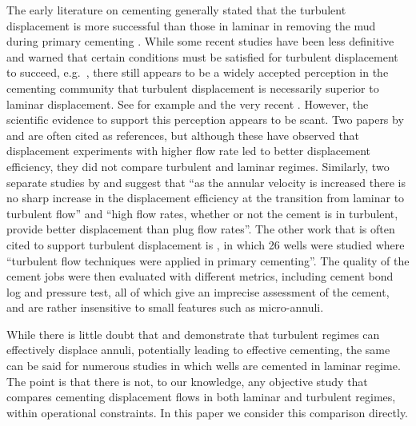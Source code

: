 \documentclass[review]{elsarticle}
\begin{document}
The early literature on cementing generally stated that the turbulent displacement is more successful than those in laminar in removing the mud during primary cementing \citep{Sauer1987,nelson1990,kettl1993}. While some recent studies have been less definitive and warned that certain conditions must be satisfied for turbulent displacement to succeed, e.g.~\cite{nelson06,khalilova2013}, there still appears to be a widely accepted perception in the cementing community that turbulent displacement is necessarily superior to laminar displacement. See for example \citet{kelessidis1996} and the very recent \citet{Lavrov2016,enayatpour2017}. However, the scientific evidence to support this perception appears to be scant. Two papers by \citet{howard1948} and \citet{smith1991} are often cited as references, but although these have observed that displacement experiments with higher flow rate led to better displacement efficiency, they did not compare turbulent and laminar regimes. Similarly, two separate studies by \citet{smith1989} and \citet{haut1979} suggest that ``as the annular velocity is increased there is no sharp increase in the displacement efficiency at the transition from laminar to turbulent flow'' and ``high flow rates, whether or not the cement is in turbulent, provide better displacement than plug flow rates''. The other work that is often cited to support turbulent displacement is \citet{Brice1964}, in which 26 wells were studied where ``turbulent flow techniques were applied in primary cementing''. The quality of the cement jobs were then evaluated with different metrics, including cement bond log and pressure test, all of which give an imprecise assessment of the cement, and are rather insensitive to small features such as micro-annuli.

While there is little doubt that \cite{howard1948,Brice1964} and \cite{smith1991} demonstrate that turbulent regimes can effectively displace annuli, potentially leading to effective cementing, the same can be said for numerous studies in which wells are cemented in laminar regime. The point is that there is not, to our knowledge, any objective study that compares cementing displacement flows in both laminar and turbulent regimes, within operational constraints. In this paper we consider this comparison directly.
\end{document}
